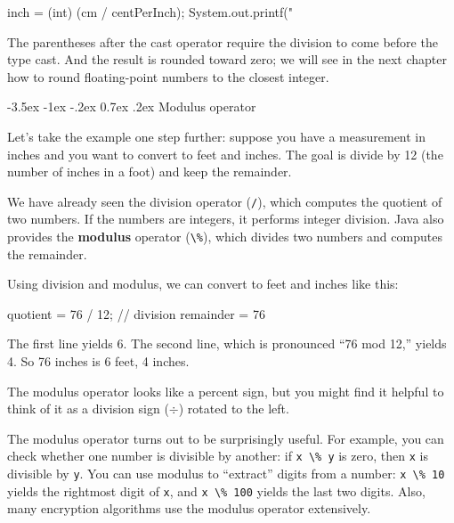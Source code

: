 \documentclass[12pt]{book}
\makeatletter
\theoremstyle{exercise}
\newcommand{\java}[1]{\verb"#1"}
\renewcommand{\section}{\@startsection{section}{1}{\z@}%
    {-3.5ex \@plus -1ex \@minus -.2ex}%
    {0.7ex \@plus.2ex}%
    {\normalfont\Large\bfseries}}
\newcommand{\java}[1]{\lstinline{#1}} %
\makeatother
\begin{document}
\begin{code}
    inch = (int) (cm / centPerInch);
    System.out.printf("%
\end{code}

The parentheses after the cast operator require the division to come before the type cast.
And the result is rounded toward zero; we will see in the next chapter how to round floating-point numbers to the closest integer.


\section{Modulus operator}

Let's take the example one step further: suppose you have a measurement in inches and you want to convert to feet and inches.
The goal is divide by 12 (the number of inches in a foot) and keep the remainder.


We have already seen the division operator (\java{/}), which computes the quotient of two numbers.
If the numbers are integers, it performs integer division.
Java also provides the {\bf modulus} operator (\java{\%}), which divides two numbers and computes the remainder.

Using division and modulus, we can convert to feet and inches like this:

\begin{code}
    quotient = 76 / 12;   // division
    remainder = 76 %
\end{code}

The first line yields 6.
The second line, which is pronounced ``76 mod 12,'' yields 4.
So 76 inches is 6 feet, 4 inches.

The modulus operator looks like a percent sign, but you might find it helpful to think of it as a division sign ($\div$) rotated to the left.



The modulus operator turns out to be surprisingly useful.
For example, you can check whether one number is divisible by another: if \java{x \% y} is zero, then \java{x} is divisible by \java{y}.
You can use modulus to ``extract'' digits from a number: \java{x \% 10} yields the rightmost digit of \java{x}, and \java{x \% 100} yields the last two digits.
Also, many encryption algorithms use the modulus operator extensively.
\end{document}

